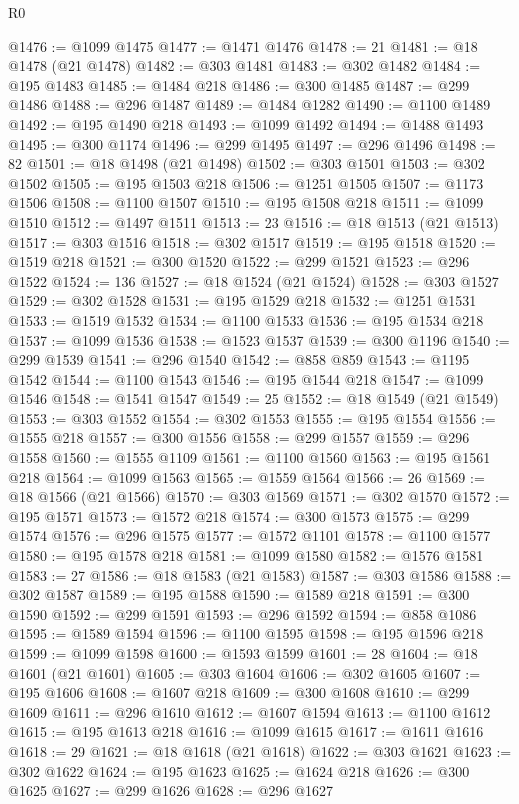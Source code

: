 \begin{lexlean}{R0}
\begin{coremodule}
@1476 := @1099 @1475
@1477 := @1471 @1476
@1478 := 21
@1481 := @18 @1478 (@21 @1478)
@1482 := @303 @1481
@1483 := @302 @1482
@1484 := @195 @1483
@1485 := @1484 @218
@1486 := @300 @1485
@1487 := @299 @1486
@1488 := @296 @1487
@1489 := @1484 @1282
@1490 := @1100 @1489
@1492 := @195 @1490 @218
@1493 := @1099 @1492
@1494 := @1488 @1493
@1495 := @300 @1174
@1496 := @299 @1495
@1497 := @296 @1496
@1498 := 82
@1501 := @18 @1498 (@21 @1498)
@1502 := @303 @1501
@1503 := @302 @1502
@1505 := @195 @1503 @218
@1506 := @1251 @1505
@1507 := @1173 @1506
@1508 := @1100 @1507
@1510 := @195 @1508 @218
@1511 := @1099 @1510
@1512 := @1497 @1511
@1513 := 23
@1516 := @18 @1513 (@21 @1513)
@1517 := @303 @1516
@1518 := @302 @1517
@1519 := @195 @1518
@1520 := @1519 @218
@1521 := @300 @1520
@1522 := @299 @1521
@1523 := @296 @1522
@1524 := 136
@1527 := @18 @1524 (@21 @1524)
@1528 := @303 @1527
@1529 := @302 @1528
@1531 := @195 @1529 @218
@1532 := @1251 @1531
@1533 := @1519 @1532
@1534 := @1100 @1533
@1536 := @195 @1534 @218
@1537 := @1099 @1536
@1538 := @1523 @1537
@1539 := @300 @1196
@1540 := @299 @1539
@1541 := @296 @1540
@1542 := @858 @859
@1543 := @1195 @1542
@1544 := @1100 @1543
@1546 := @195 @1544 @218
@1547 := @1099 @1546
@1548 := @1541 @1547
@1549 := 25
@1552 := @18 @1549 (@21 @1549)
@1553 := @303 @1552
@1554 := @302 @1553
@1555 := @195 @1554
@1556 := @1555 @218
@1557 := @300 @1556
@1558 := @299 @1557
@1559 := @296 @1558
@1560 := @1555 @1109
@1561 := @1100 @1560
@1563 := @195 @1561 @218
@1564 := @1099 @1563
@1565 := @1559 @1564
@1566 := 26
@1569 := @18 @1566 (@21 @1566)
@1570 := @303 @1569
@1571 := @302 @1570
@1572 := @195 @1571
@1573 := @1572 @218
@1574 := @300 @1573
@1575 := @299 @1574
@1576 := @296 @1575
@1577 := @1572 @1101
@1578 := @1100 @1577
@1580 := @195 @1578 @218
@1581 := @1099 @1580
@1582 := @1576 @1581
@1583 := 27
@1586 := @18 @1583 (@21 @1583)
@1587 := @303 @1586
@1588 := @302 @1587
@1589 := @195 @1588
@1590 := @1589 @218
@1591 := @300 @1590
@1592 := @299 @1591
@1593 := @296 @1592
@1594 := @858 @1086
@1595 := @1589 @1594
@1596 := @1100 @1595
@1598 := @195 @1596 @218
@1599 := @1099 @1598
@1600 := @1593 @1599
@1601 := 28
@1604 := @18 @1601 (@21 @1601)
@1605 := @303 @1604
@1606 := @302 @1605
@1607 := @195 @1606
@1608 := @1607 @218
@1609 := @300 @1608
@1610 := @299 @1609
@1611 := @296 @1610
@1612 := @1607 @1594
@1613 := @1100 @1612
@1615 := @195 @1613 @218
@1616 := @1099 @1615
@1617 := @1611 @1616
@1618 := 29
@1621 := @18 @1618 (@21 @1618)
@1622 := @303 @1621
@1623 := @302 @1622
@1624 := @195 @1623
@1625 := @1624 @218
@1626 := @300 @1625
@1627 := @299 @1626
@1628 := @296 @1627

\end{coremodule}
\end{lexlean}
